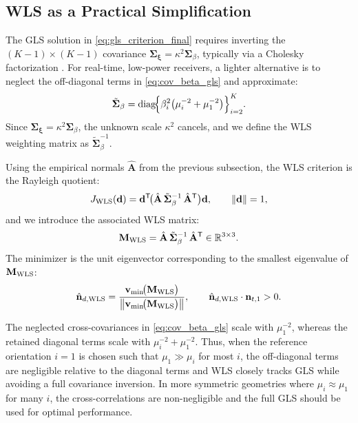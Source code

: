 \documentclass[journal]{IEEEtran}
\begin{document}
\subsection{WLS as a Practical Simplification}

The GLS solution in \eqref{eq:gls_criterion_final} requires inverting the \((K\!-\!1)\times(K\!-\!1)\) covariance \(\mathbf\Sigma_{\boldsymbol{\xi}}=\kappa^{2}\mathbf\Sigma_{\beta}\), typically via a Cholesky factorization \cite{golub2013matrix}. 
For real-time, low-power receivers, a lighter alternative is to neglect the off-diagonal terms in \eqref{eq:cov_beta_gls} and approximate:
\begin{equation}
\tilde{\mathbf\Sigma}_{\beta}
=
\operatorname{diag}\!\Bigl\{
\beta_i^{2}\bigl(\mu_i^{-2}+\mu_1^{-2}\bigr)
\Bigr\}_{i=2}^{K}.
\label{eq:Sigma_beta_diag}
\end{equation}
Since \(\mathbf\Sigma_{\boldsymbol{\xi}}=\kappa^{2}\mathbf\Sigma_{\beta}\), the unknown scale \(\kappa^{2}\) cancels, and we define the WLS weighting matrix as \(\tilde{\mathbf\Sigma}_{\beta}^{-1}\).

Using the empirical normals \(\hat{\mathbf A}\) from the previous subsection, the WLS criterion is the Rayleigh quotient:
\begin{equation}
J_{\rm WLS}(\mathbf d)
=\mathbf d^{\mathsf T}\!\bigl(\hat{\mathbf A}\,\tilde{\mathbf\Sigma}_{\beta}^{-1}\,\hat{\mathbf A}^{\mathsf T}\bigr)\mathbf d,
\qquad \|\mathbf d\|=1,
\label{eq:WLS_cost}
\end{equation}
and we introduce the associated WLS matrix:
\begin{equation}
\mathbf M_{\rm WLS}
=
\hat{\mathbf A}\,\tilde{\mathbf\Sigma}_{\beta}^{-1}\,\hat{\mathbf A}^{\mathsf T}\in\mathbb R^{3\times 3}.
\label{eq:M_WLS}
\end{equation}
The minimizer is the unit eigenvector corresponding to the smallest eigenvalue of \(\mathbf M_{\rm WLS}\):
\begin{equation}
\hat{\mathbf n}_{d,{\rm WLS}}
=\frac{\mathbf v_{\min}\!\bigl(\mathbf M_{\rm WLS}\bigr)}
      {\bigl\|\mathbf v_{\min}\!\bigl(\mathbf M_{\rm WLS}\bigr)\bigr\|},
\qquad
\hat{\mathbf n}_{d,{\rm WLS}}\cdot\mathbf n_{t,1} > 0.
\label{eq:WLS_solution}
\end{equation}

The neglected cross-covariances in \eqref{eq:cov_beta_gls} scale with \(\mu_1^{-2}\), whereas the retained diagonal terms scale with \(\mu_i^{-2}+\mu_1^{-2}\). Thus, when the reference orientation \(i=1\) is chosen such that \(\mu_1\gg \mu_i\) for most \(i\), the off-diagonal terms are negligible relative to the diagonal terms and WLS closely tracks GLS while avoiding a full covariance inversion. In more symmetric geometries where \(\mu_i\approx\mu_1\) for many \(i\), the cross-correlations are non-negligible and the full GLS should be used for optimal performance.
\end{document}
